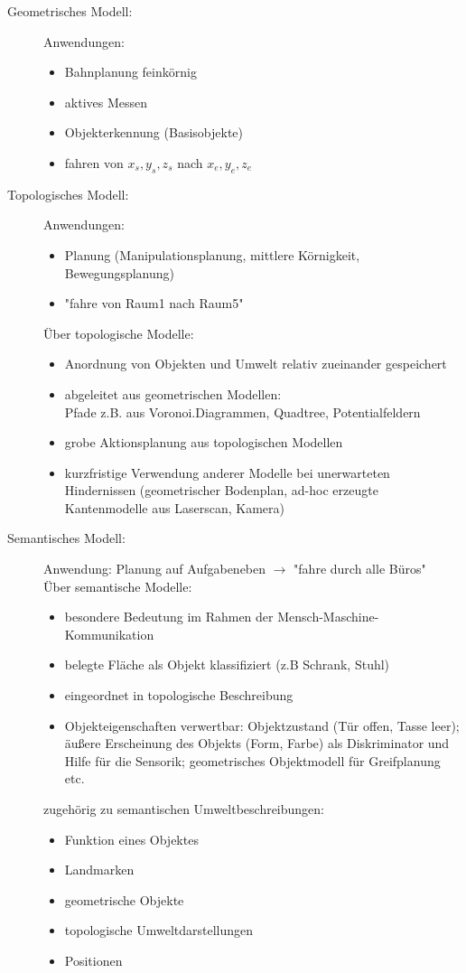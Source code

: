 \begin{description}
\item[Geometrisches Modell:] Anwendungen:
\begin{itemize}
\item Bahnplanung feinkörnig
\item aktives Messen
\item Objekterkennung (Basisobjekte)
\item fahren von $x_s,y_s,z_s$ nach $x_e,y_e,z_e$
\end{itemize}
\item[Topologisches Modell:] Anwendungen:
\begin{itemize}
\item Planung (Manipulationsplanung, mittlere Körnigkeit, Bewegungsplanung)
\item "{}fahre von Raum1 nach Raum5"{}
\end{itemize}
Über topologische Modelle:
\begin{itemize}
\item Anordnung von Objekten und Umwelt relativ zueinander gespeichert
\item abgeleitet aus geometrischen Modellen: \\ Pfade z.B. aus Voronoi.Diagrammen, Quadtree, Potentialfeldern
\item grobe Aktionsplanung aus topologischen Modellen
\item kurzfristige Verwendung anderer Modelle bei unerwarteten Hindernissen (geometrischer Bodenplan, ad-hoc erzeugte Kantenmodelle aus Laserscan, Kamera)
\end{itemize}
\item[Semantisches Modell:] Anwendung: Planung auf Aufgabeneben $\to$ "{}fahre durch alle Büros"{} \\
Über semantische Modelle:
\begin{itemize}
\item besondere Bedeutung im Rahmen der Mensch-Maschine-Kommunikation
\item belegte Fläche als Objekt klassifiziert (z.B Schrank, Stuhl)
\item eingeordnet in topologische Beschreibung
\item Objekteigenschaften verwertbar: Objektzustand (Tür offen, Tasse leer); äußere Erscheinung des Objekts (Form, Farbe) als Diskriminator und Hilfe für die Sensorik; geometrisches Objektmodell für Greifplanung etc.
\end{itemize}
zugehörig zu semantischen Umweltbeschreibungen:
\begin{itemize}
\item Funktion eines Objektes
\item Landmarken
\item geometrische Objekte
\item topologische Umweltdarstellungen
\item Positionen
\end{itemize}
\end{description}

